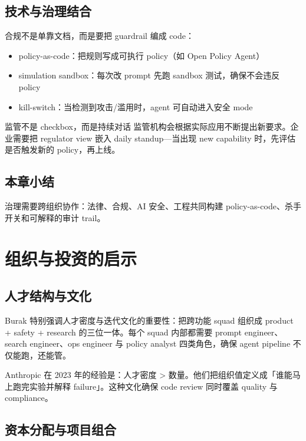 \documentclass[a4paper]{article}
\begin{document}
\subsection{技术与治理结合}

合规不是单靠文档，而是要把 guardrail 编成 code：

\begin{itemize}
    \item policy-as-code：把规则写成可执行 policy（如 Open Policy Agent）
    \item simulation sandbox：每次改 prompt 先跑 sandbox 测试，确保不会违反 policy
    \item kill-switch：当检测到攻击/滥用时，agent 可自动进入安全 mode
\end{itemize}

\begin{warningbox}{监管不是 checkbox，而是持续对话}
监管机构会根据实际应用不断提出新要求。企业需要把 regulator view 嵌入 daily standup—当出现 new capability 时，先评估是否触发新的 policy，再上线。
\end{warningbox}

\subsection{本章小结}

治理需要跨组织协作：法律、合规、AI 安全、工程共同构建 policy-as-code、杀手开关和可解释的审计 trail。

\section{组织与投资的启示}

\subsection{人才结构与文化}

Burak 特别强调人才密度与迭代文化的重要性：把跨功能 squad 组织成 product + safety + research 的三位一体。每个 squad 内部都需要 prompt engineer、search engineer、ops engineer 与 policy analyst 四类角色，确保 agent pipeline 不仅能跑，还能管。

Anthropic 在 2023 年的经验是：人才密度 > 数量。他们把组织值定义成「谁能马上跑完实验并解释 failure」。这种文化确保 code review 同时覆盖 quality 与 compliance。

\subsection{资本分配与项目组合}
\end{document}
